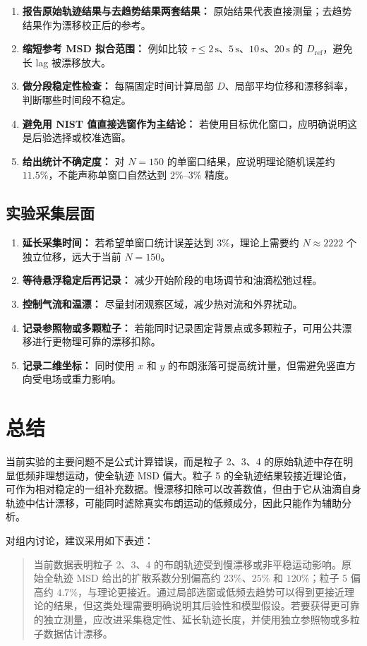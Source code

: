 \documentclass[12pt,a4paper]{ctexart}
\begin{document}
\begin{enumerate}[leftmargin=2em]
  \item \textbf{报告原始轨迹结果与去趋势结果两套结果：} 原始结果代表直接测量；去趋势结果作为漂移校正后的参考。
  \item \textbf{缩短参考 MSD 拟合范围：} 例如比较 $\tau \le 2\,\mathrm{s}$、$5\,\mathrm{s}$、$10\,\mathrm{s}$、$20\,\mathrm{s}$ 的 $D_{\mathrm{ref}}$，避免长 lag 被漂移放大。
  \item \textbf{做分段稳定性检查：} 每隔固定时间计算局部 $D$、局部平均位移和漂移斜率，判断哪些时间段不稳定。
  \item \textbf{避免用 NIST 值直接选窗作为主结论：} 若使用目标优化窗口，应明确说明这是后验选择或校准选窗。
  \item \textbf{给出统计不确定度：} 对 $N=150$ 的单窗口结果，应说明理论随机误差约 $11.5\%$，不能声称单窗口自然达到 $2\%$--$3\%$ 精度。
\end{enumerate}

\subsection{实验采集层面}

\begin{enumerate}[leftmargin=2em]
  \item \textbf{延长采集时间：} 若希望单窗口统计误差达到 $3\%$，理论上需要约 $N\approx 2222$ 个独立位移，远大于当前 $N=150$。
  \item \textbf{等待悬浮稳定后再记录：} 减少开始阶段的电场调节和油滴松弛过程。
  \item \textbf{控制气流和温漂：} 尽量封闭观察区域，减少热对流和外界扰动。
  \item \textbf{记录参照物或多颗粒子：} 若能同时记录固定背景点或多颗粒子，可用公共漂移进行更物理可靠的漂移扣除。
  \item \textbf{记录二维坐标：} 同时使用 $x$ 和 $y$ 的布朗涨落可提高统计量，但需避免竖直方向受电场或重力影响。
\end{enumerate}

\section{总结}

当前实验的主要问题不是公式计算错误，而是粒子 2、3、4 的原始轨迹中存在明显低频非理想运动，使全轨迹 MSD 偏大。粒子 5 的全轨迹结果较接近理论值，可作为相对稳定的一组补充数据。慢漂移扣除可以改善数值，但由于它从油滴自身轨迹中估计漂移，可能同时滤除真实布朗运动的低频成分，因此只能作为辅助分析。

对组内讨论，建议采用如下表述：

\begin{quote}
当前数据表明粒子 2、3、4 的布朗轨迹受到慢漂移或非平稳运动影响。原始全轨迹 MSD 给出的扩散系数分别偏高约 $23\%$、$25\%$ 和 $120\%$；粒子 5 偏高约 $4.7\%$，与理论更接近。通过局部选窗或低频去趋势可以得到更接近理论的结果，但这类处理需要明确说明其后验性和模型假设。若要获得更可靠的独立测量，应改进采集稳定性、延长轨迹长度，并使用独立参照物或多粒子数据估计漂移。
\end{quote}
\end{document}
